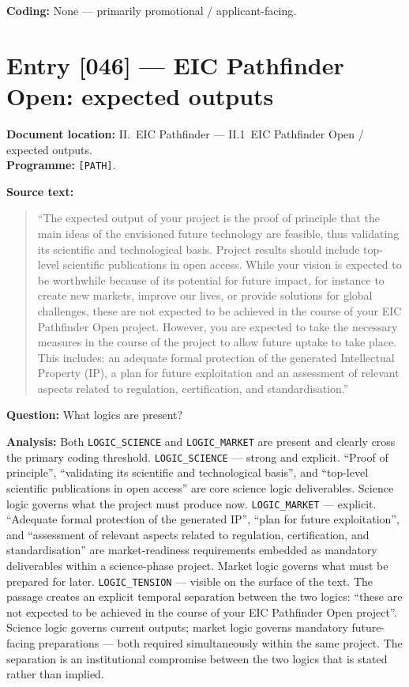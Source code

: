 \textbf{Coding:} None --- primarily promotional / applicant-facing.

\section*{Entry [046] --- EIC Pathfinder Open: expected outputs}

\textbf{Document location:} II.~EIC Pathfinder --- II.1~EIC Pathfinder
Open / expected outputs. \\
\textbf{Programme:} \texttt{[PATH]}.

\textbf{Source text:}
\begin{quote}
\enquote{The expected output of your project is the proof of principle
that the main ideas of the envisioned future technology are feasible,
thus validating its scientific and technological basis. Project
results should include top-level scientific publications in open
access. While your vision is expected to be worthwhile because of its
potential for future impact, for instance to create new markets,
improve our lives, or provide solutions for global challenges, these
are not expected to be achieved in the course of your EIC Pathfinder
Open project. However, you are expected to take the necessary measures
in the course of the project to allow future uptake to take place.
This includes: an adequate formal protection of the generated
Intellectual Property (IP), a plan for future exploitation and an
assessment of relevant aspects related to regulation, certification,
and standardisation.}
\end{quote}

\textbf{Question:} What logics are present?

\textbf{Analysis:} Both \texttt{LOGIC\_SCIENCE} and
\texttt{LOGIC\_MARKET} are present and clearly cross the primary
coding threshold. \texttt{LOGIC\_SCIENCE} --- strong and explicit.
\enquote{Proof of principle}, \enquote{validating its scientific and
technological basis}, and \enquote{top-level scientific publications
in open access} are core science logic deliverables. Science logic
governs what the project must produce now.
\texttt{LOGIC\_MARKET} --- explicit. \enquote{Adequate formal
protection of the generated IP}, \enquote{plan for future
exploitation}, and \enquote{assessment of relevant aspects related to
regulation, certification, and standardisation} are market-readiness
requirements embedded as mandatory deliverables within a science-phase
project. Market logic governs what must be prepared for later.
\texttt{LOGIC\_TENSION} --- visible on the surface of the text. The
passage creates an explicit temporal separation between the two
logics: \enquote{these are not expected to be achieved in the course
of your EIC Pathfinder Open project}. Science logic governs current
outputs; market logic governs mandatory future-facing preparations ---
both required simultaneously within the same project. The separation
is an institutional compromise between the two logics that is stated
rather than implied.

